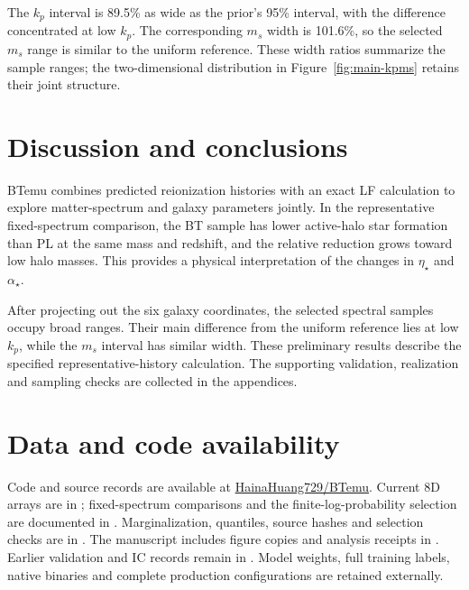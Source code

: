 The $k_p$ interval is 89.5\% as wide as the prior's 95\% interval, with the difference concentrated at low $k_p$. The corresponding $m_s$ width is 101.6\%, so the selected $m_s$ range is similar to the uniform reference. These width ratios summarize the sample ranges; the two-dimensional distribution in Figure~\ref{fig:main-kpms} retains their joint structure.

\section{Discussion and conclusions}\label{conclusions}

BTemu combines predicted reionization histories with an exact LF calculation to explore matter-spectrum and galaxy parameters jointly. In the representative fixed-spectrum comparison, the BT sample has lower active-halo star formation than PL at the same mass and redshift, and the relative reduction grows toward low halo masses. This provides a physical interpretation of the changes in $\eta_\star$ and $\alpha_\star$.

After projecting out the six galaxy coordinates, the selected spectral samples occupy broad ranges. Their main difference from the uniform reference lies at low $k_p$, while the $m_s$ interval has similar width. These preliminary results describe the specified representative-history calculation. The supporting validation, realization and sampling checks are collected in the appendices.

\section*{Data and code availability}

Code and source records are available at \href{https://github.com/HainaHuang729/BTemu}{HainaHuang729/BTemu}. Current 8D arrays are in ; fixed-spectrum comparisons and the finite-log-probability selection are documented in . Marginalization, quantiles, source hashes and selection checks are in . The manuscript includes figure copies and analysis receipts in . Earlier validation and IC records remain in . Model weights, full training labels, native binaries and complete production configurations are retained externally.



\clearpage\appendix
\setcounter{figure}{0}
\setcounter{table}{0}

